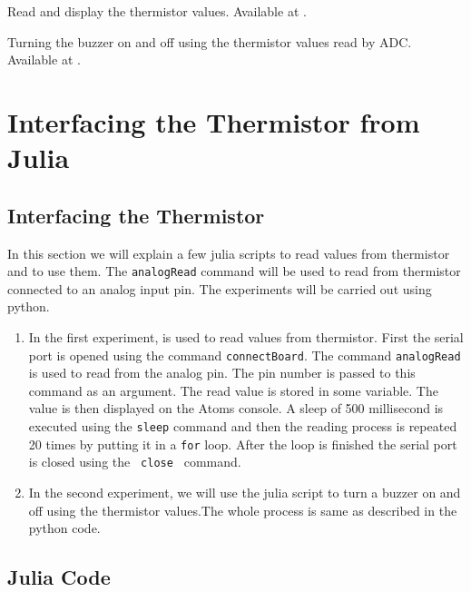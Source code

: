 \begin{pycode}
   {Read and display
    the thermistor values.  Available at
    .}
\label{py:therm-read}

\end{pycode}

\begin{pycode}
  {Turning the buzzer on and off using the thermistor values read by
    ADC.  Available at .}
\label{py:therm-buzzer}

\end{pycode}

\section{Interfacing the Thermistor from Julia}
\subsection{Interfacing the Thermistor}
In this section we will explain a few julia scripts to read values
from thermistor and to use them.  The {\tt analogRead} command
will be used to read from thermistor connected to an analog input
pin. The experiments will be carried out using python.

\begin{enumerate}
\item In the first experiment,  is used to read
  values from thermistor. First the serial port is opened using the
  command {\tt connectBoard}. The command {\tt analogRead} is used to read from the
  analog pin. The pin number is passed to this command as an
  argument. The read value is stored in some variable. The value is
  then displayed on the Atoms console. A sleep of 500 millisecond is
  executed using the {\tt sleep} command and then the reading process
  is repeated 20 times by putting it in a {\tt for} loop. After the
  loop is finished the serial port is closed using the {\tt
    close } command.

\item In the second experiment, we will use the julia script to
  turn a buzzer on and off using the thermistor values.The whole
  process is same as described in the python code. 
\end{enumerate}

\subsection{Julia Code}
\label{sec:therm-julia-code}


